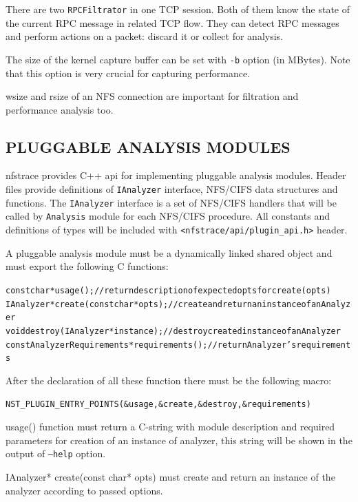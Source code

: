 \documentclass[oneside]{article}
\newcommand{\code}[1]{\texttt{#1}}
\newcommand{\gls}{}
\newcommand*{\textfile}[1]{\textsf{#1}}
\newcommand*{\textprog}[1]{\textfile{#1}}
\begin{document}
There are two \code{RPCFiltrator} in one TCP session. Both of them
know the state of the current RPC message in related TCP flow. They can detect
RPC messages and perform actions on a packet: discard it or collect for
analysis.

The size of the kernel capture buffer can be set with \code{-b} option (in
MBytes).  Note that this option is very crucial for capturing performance.

\gls{wsize} and \gls{rsize} of an \gls{NFS} connection are important for
filtration and performance analysis too.

\subsection{PLUGGABLE ANALYSIS MODULES}

nfstrace provides C++ api for implementing pluggable analysis modules. Header
files provide definitions of \code{IAnalyzer} interface, NFS/CIFS data structures and
functions. The \code{IAnalyzer} interface is a set of NFS/CIFS handlers that will be
called by \code{Analysis} module for each NFS/CIFS procedure. All constants and
definitions of types will be included with \code{<nfstrace/api/plugin\_api.h>} header.

A pluggable analysis module must be a dynamically linked shared object and must
export the following C functions:

\begin{alltt}
const char* usage (); // return description of expected opts for create(opts)
IAnalyzer* create (const char* opts); // create and return an instance of an Analyzer 
void destroy (IAnalyzer* instance); // destroy created instance of an Analyzer 
const AnalyzerRequirements* requirements(); // return Analyzer's requirements 
\end{alltt}
After the declaration of all these function there must be the following macro:
\begin{alltt}
NST\_PLUGIN\_ENTRY\_POINTS (\&usage, \&create, \&destroy, \&requirements)
\end{alltt}

\textprog{usage()} function must return a C-string with module description and
required parameters for creation of an instance of analyzer, this string will
be shown in the output of \code{--help} option.

\textprog{IAnalyzer* create(const char* opts)} must create and return an instance
of the analyzer according to passed options.  
\end{document}
